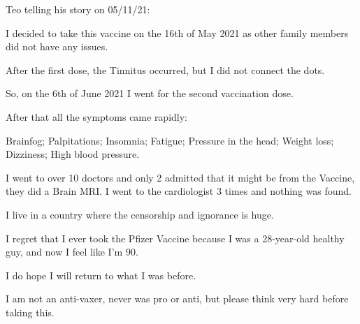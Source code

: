 Teo telling his story on 05/11/21:

I decided to take this vaccine on the 16th of May 2021 as other family members
did not have any issues.

After the first dose, the Tinnitus occurred, but I did not connect the dots.

So, on the 6th of June 2021 I went for the second vaccination dose.

After that all the symptoms came rapidly:

Brainfog; Palpitations; Insomnia; Fatigue; Pressure in the head; Weight loss;
Dizziness; High blood pressure.

I went to over 10 doctors and only 2 admitted that it might be from the Vaccine,
they did a Brain MRI. I went to the cardiologist 3 times and nothing was found.

I live in a country where the censorship and ignorance is huge.

I regret that I ever took the Pfizer Vaccine because I was a 28-year-old healthy
guy, and now I feel like I’m 90.

I do hope I will return to what I was before.

I am not an anti-vaxer, never was pro or anti, but please think very hard before
taking this.
